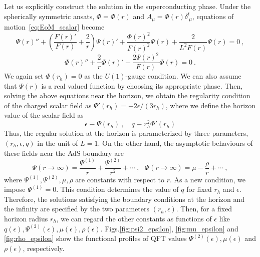 \documentclass[a4paper,11pt]{article}
\begin{document}
    Let us explicitly construct the solution in the superconducting phase.
    Under the spherically symmetric ansats, $\Phi=\Phi(r)$ and $A_\mu = \Phi(r)\delta^t_{\ \mu}$, equations of motion~\eqref{eq:EoM_scalar} become
    \begin{equation} \label{eq:background_scalar}
        \Psi(r)'' + \left( \frac{F(r)'}{F(r)}+\frac{2}{r} \right)\Psi(r)' + \frac{\Phi(r)^2}{F(r)^2}\Psi(r) + \frac{2}{L^2 F(r)}\Psi(r) = 0\ ,
    \end{equation}
    \begin{equation} \label{eq:background_gauge}
        \Phi(r)'' + \frac{2}{r}\Phi(r)' -\frac{2 \Psi(r)^2}{F(r)}\Phi(r)=0\ .
    \end{equation}
    We again set $\Phi(r_h)=0$ as the $U(1)$-gauge condition. We can also assume that $\Psi(r)$ is a real valued function by choosing its appropriate phase.
    Then, solving the above equations near the horizon, we obtain the regularity condition of the charged scalar field as $\Psi'(r_h)=-2\epsilon/(3r_h)$,
    where we define the horizon value of the scalar field as
    \begin{equation}
        \epsilon \equiv \Psi(r_h)\ ,\quad q\equiv r_h^2 \Phi'(r_h)
    \end{equation}
    Thus, the regular solution at the horizon is parameterized by three parameters, $(r_h,\epsilon,q)$ in the unit of $L=1$.
    On the other hand, the asymptotic behaviours of these fields near the AdS boundary are
    \begin{equation}
        \Psi(r \to \infty) = \frac{\Psi^{(1)}}{r} + \frac{\Psi^{(2)}}{r^2} + \cdots\ ,
        \ \ \ 
        \Phi(r \to \infty) = \mu - \frac{\rho}{r} + \cdots\ ,
    \end{equation}
    where $\Psi^{(1)},\Psi^{(2)},\mu,\rho$ are constants with respect to $r$. 
    As a new condition, we impose $\Psi^{(1)}=0$. This condition determines the value of $q$ for fixed $r_h$ and $\epsilon$.
    Therefore, the solutions satisfying the boundary conditions at the horizon and the infinity are  specified by the two parameters $(r_h,\epsilon)$.
    Then, for a fixed horizon radius $r_h$, we can regard the other constants as functions of $\epsilon$ like $q(\epsilon), \Psi^{(2)}(\epsilon), \mu(\epsilon), \rho(\epsilon)$. 
    Figs.\ref{fig:psi2_epsilon}, \ref{fig:mu_epsilon} and \ref{fig:rho_epsilon} show the functional profiles of QFT values $\Psi^{(2)}(\epsilon), \mu(\epsilon)$ and $\rho(\epsilon)$, respectively.
\end{document}
